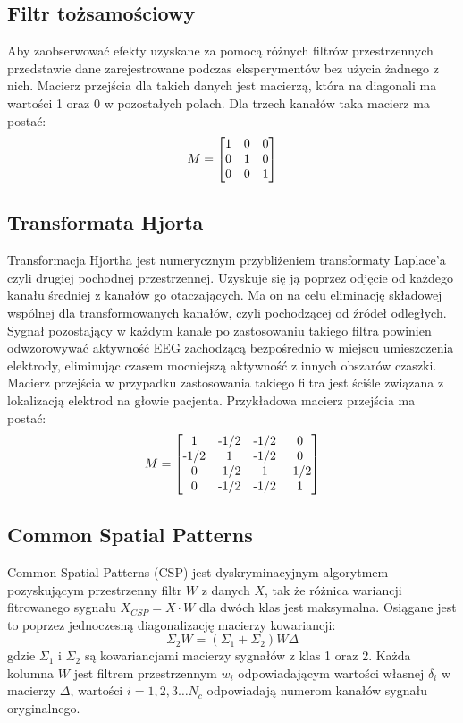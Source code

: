 \documentclass[licencjacka,openright]{pracamgr}
\begin{document}
\subsection{Filtr tożsamościowy}
Aby zaobserwować efekty uzyskane za pomocą różnych filtrów przestrzennych przedstawie dane zarejestrowane podczas eksperymentów bez użycia żadnego z nich. Macierz przejścia dla takich danych jest macierzą, która na diagonali ma wartości 1 oraz 0 w pozostałych polach.
Dla trzech kanałów taka macierz ma postać:
\[
M =
\begin{bmatrix}
  $1$ & $0$ & $0$ \\
  $0$ & $1$ & $0$ \\
  $0$ & $0$ & $1$ 
\end{bmatrix}
\]

\subsection{Transformata Hjorta}
Transformacja Hjortha jest numerycznym przybliżeniem transformaty Laplace'a czyli drugiej pochodnej przestrzennej. Uzyskuje się ją poprzez odjęcie od każdego kanału średniej z kanałów go otaczających. Ma on na celu eliminację składowej wspólnej dla transformowanych kanałów, czyli pochodzącej od źródeł odległych. Sygnał pozostający w każdym kanale po zastosowaniu takiego filtra powinien odwzorowywać aktywność EEG zachodzącą bezpośrednio w miejscu umieszczenia elektrody, eliminując czasem mocniejszą aktywność z innych obszarów czaszki.
Macierz przejścia w przypadku zastosowania takiego filtra jest ściśle związana z lokalizacją elektrod na głowie pacjenta.
Przykładowa macierz przejścia ma postać:
\[
M =
\begin{bmatrix}
  $1$ & $-1/2$ & $-1/2$ & $0$ \\
  $-1/2$ & $1$ & $-1/2$ & $0$ \\
  $0$ & $-1/2$ & $1$ & $-1/2$ \\
  $0$ & $-1/2$ & $-1/2$ & $1$ 
\end{bmatrix}
\]

\subsection{Common Spatial Patterns}
Common Spatial Patterns (CSP) jest dyskryminacyjnym algorytmem pozyskującym przestrzenny filtr $W$ z danych $X$, tak że różnica wariancji fitrowanego sygnału $X_{CSP} = X \cdot W$ dla dwóch klas jest maksymalna. Osiągane jest to poprzez jednoczesną diagonalizację macierzy kowariancji:
\begin{equation}
\Sigma _2 W = (\Sigma _1 + \Sigma _2 )W \Delta
\end{equation}
gdzie $\Sigma_1$ i $\Sigma_2$ są kowariancjami macierzy sygnałów z klas 1 oraz 2. Każda kolumna $W$ jest filtrem przestrzennym $w_i$ odpowiadającym wartości własnej $\delta _i$ w macierzy $\Delta$, wartości $i = 1,2,3 \ldots N_c$ odpowiadają numerom kanałów sygnału oryginalnego. \citep{sannelli2011}
\end{document}
